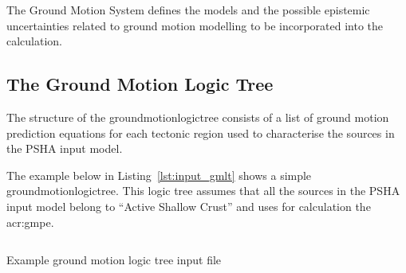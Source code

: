 The Ground Motion System defines the models and the possible epistemic
uncertainties related to ground motion modelling to be incorporated into the
calculation.

\subsection{The Ground Motion Logic Tree}
\label{subsec:gmlt}

The structure of the \gls{groundmotionlogictree} consists of a list of ground
motion prediction equations for each tectonic region used to characterise the
sources in the PSHA input model.

The example below in Listing~\ref{lst:input_gmlt} shows a simple
\gls{groundmotionlogictree}. This logic tree assumes that all the sources in
the PSHA input model belong to ``Active Shallow Crust'' and uses for
calculation the \citet{chiou2008} \gls{acr:gmpe}.

\begin{listing}[htbp]
  \inputminted[firstline=1,firstnumber=1,fontsize=\footnotesize,frame=single,linenos,bgcolor=lightgray]{xml}{oqum/hazard/verbatim/input_gmlt.xml}
  \caption{Example ground motion logic tree input file}
  \label{lst:input_gmlt}
\end{listing}
